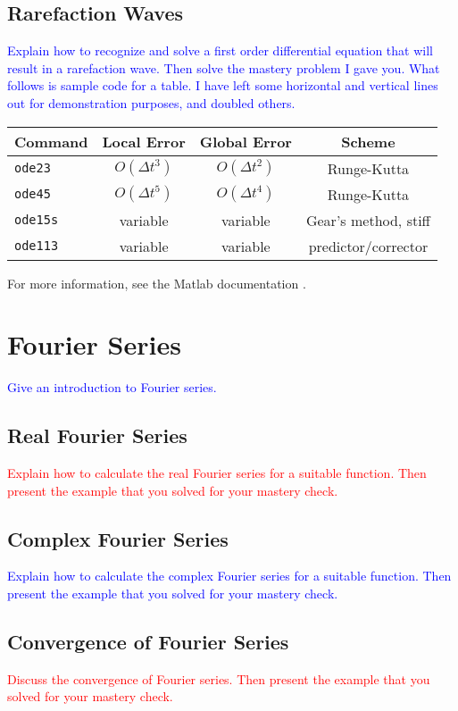 \documentclass{article}
\newcommand{\red}[1]{\textcolor{red}{#1}}
\newcommand{\blue}[1]{\textcolor{blue}{#1}}
\begin{document}
\subsection{Rarefaction Waves}
\blue{Explain how to recognize and solve a first order differential equation that will result in a rarefaction wave. Then solve the mastery problem I gave you. What follows is sample code for a table. I have left some horizontal and vertical lines out for demonstration purposes, and doubled others.}
\begin{center}
\begin{tabular}{|l|ccc|} \hline
\textbf{Command} & \textbf{Local Error} & \textbf{Global Error} & \textbf{Scheme} \\ \hline \hline  
  \texttt{ode23} & $O(\Delta t^3)$ & $O(\Delta t^2)$ & Runge-Kutta\\
  \texttt{ode45} & $O(\Delta t^5)$ & $O(\Delta t^4)$ & Runge-Kutta \\ \hline
  \texttt{ode15s} & variable  & variable & Gear's method, stiff\\
  \texttt{ode113} & variable & variable & predictor/corrector \\ \hline
  \end{tabular}
  \end{center}
For more information, see the Matlab documentation \cite{matlabode}.
\section{Fourier Series}
\blue{Give an introduction to Fourier series.}
\subsection{Real Fourier Series}
\red{Explain how to calculate the real Fourier series for a suitable function. Then present the example that you solved for your mastery check.}
\subsection{Complex Fourier Series}
\blue{Explain how to calculate the complex Fourier series for a suitable function. Then present the example that you solved for your mastery check.}
\subsection{Convergence of Fourier Series}
\red{Discuss the convergence of Fourier series. Then present the example that you solved for your mastery check.}
\end{document}

